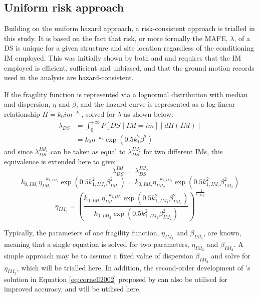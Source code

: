 \subsection{Uniform risk approach}\label{sec:uniform-risk-equiv}
Building on the uniform hazard approach, a risk-consistent approach is trialled in this study. It is based on the fact that risk, or more formally the \ac{MAFE}, $\lambda$, of a \ac{DS} is unique for a given structure and site location regardless of the conditioning \ac{IM} employed. This was initially shown by both \citet{Bradley2012a} and \citet{Lin2013_pt1} and requires that the \ac{IM} employed is efficient, sufficient and unbiased, and that the ground motion records used in the analysis are hazard-consistent. 

If the fragility function is represented via a lognormal distribution with median and dispersion, $\eta$ and $\beta$, and the hazard curve is represented as a log-linear relationship $H=k_0im^{-k_1}$, \citet{Cornell2002} solved for $\lambda$ as shown below: 
\begin{align}
    \label{eq:cornell2002}
    \lambda_{DS} &= \int_0^{+\infty} P[DS\mid IM=im]\mid dH(IM)\mid \\
    &=k_0\eta^{-k_1}\exp\left(0.5k_1^2\beta^2\right)
\end{align}
\noindent and since $\lambda_{DS}^{IM_1}$ can be taken as equal to $\lambda_{DS}^{IM_2}$ for two different \acp{IM}, this equivalence is extended here to give:
\begin{equation}
    \lambda_{DS}^{IM_1} = \lambda_{DS}^{IM_2}
\end{equation}
\begin{equation}
    k_{0,IM_1}\eta_{IM_1}^{-k_{1,IM_1}}\exp\left(0.5k_{1,IM_1}^2\beta_{IM_1}^2\right) =k_{0,IM_2}\eta_{IM_2}^{-k_{1,IM_2}}\exp\left(0.5k_{1,IM_2}^2\beta_{IM_2}^2\right)
\end{equation}
\begin{equation}
\label{mafe-uniform-risk}
    \eta_{IM_2} = \left(\dfrac{k_{0,IM_1}\eta_{IM_1}^{-k_{1,IM_1}}\exp\left(0.5k_{1,IM_1}^2\beta_{IM_1}^2\right)}{k_{0,IM_2}\exp\left(0.5k_{1,IM_2}^2\beta_{IM_2}^2\right)}\right)^{\frac{-1}{k_{1,IM_2}}}
\end{equation}
  
Typically, the parameters of one fragility function, $\eta_{IM_1}$ and $\beta_{IM_1}$, are known, meaning that a single equation is solved for two parameters, $\eta_{IM_2}$ and $\beta_{IM_2}$. A simple approach may be to assume a fixed value of dispersion $\beta_{IM_2}$ and solve for $\eta_{IM_2}$, which will be trialled here. In addition, the second-order development of \citet{Cornell2002}'s solution in Equation \eqref{eq:cornell2002} proposed by \citet{Vamvatsikos2013} can also be utilised for improved accuracy, and will be utilised here. 

